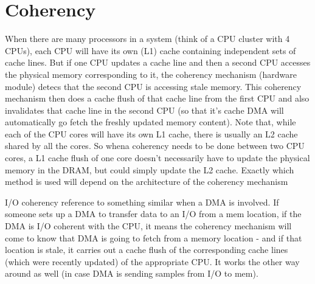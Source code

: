 \section{Coherency}
When there are many processors in a system (think of a CPU cluster with 4 CPUs), each CPU will have its own (L1) cache containing independent sets of cache lines. But if one CPU updates a cache line and then a second CPU accesses the physical memory corresponding to it, the coherency mechanism (hardware module) detecs that the second CPU is accessing stale memory. This coherency mechanism then does a cache flush of that cache line from the first CPU and also invalidates that cache line in the second CPU (so that it's cache DMA will automatically go fetch the freshly updated memory content). Note that, while each of the CPU cores will have its own L1 cache, there is usually an L2 cache shared by all the cores. So whena coherency needs to be done between two CPU cores, a L1 cache flush of one core doesn't necessarily have to update the physical memory in the DRAM, but could simply update the L2 cache. Exactly which method is used will depend on the architecture of the coherency mechanism

I/O coherency reference to something similar when a DMA is involved. If someone sets up a DMA to transfer data to an I/O from a mem location, if the DMA is I/O coherent with the CPU, it means the coherency mechanism will come to know that DMA is going to fetch from a memory location - and if that location is stale, it carries out a cache flush of the corresponding cache lines (which were recently updated) of the appropriate CPU. It works the other way around as well (in case DMA is sending samples from I/O to mem).

